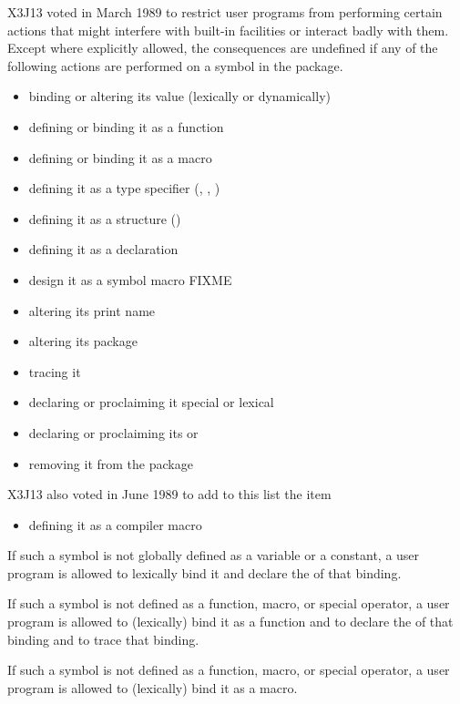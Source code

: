 \begin{newer}
X3J13 voted in March 1989 
to restrict user programs from performing certain actions that
might interfere with built-in facilities or interact badly
with them.
Except where explicitly allowed, the consequences are undefined if any
of the following actions are performed on a symbol in the 
package.
\begin{itemize}
\item binding or altering its value (lexically or dynamically)
\item defining or binding it as a function
\item defining or binding it as a macro
\item defining it as a type specifier (, , )
\item defining it as a structure ()
\item defining it as a declaration
\item design it as a symbol macro FIXME
\item altering its print name
\item altering its package
\item tracing it
\item declaring or proclaiming it special or lexical
\item declaring or proclaiming its  or 
\item removing it from the package 
\end{itemize}
X3J13 also voted in June 1989 
to add to this list the item
\begin{itemize}
\item defining it as a compiler macro
\end{itemize}

If such a symbol is not globally defined as a variable or a constant,
a user program is allowed to lexically bind it and declare the  of
that binding.

If such a symbol is not defined as a function, macro, or special operator,
a user program is allowed to (lexically) bind it as a function and to declare the
 of that binding and to trace that binding.

If such a symbol is not defined as a function, macro, or special operator,
a user program is allowed to (lexically) bind it as a macro.


\end{newer}
